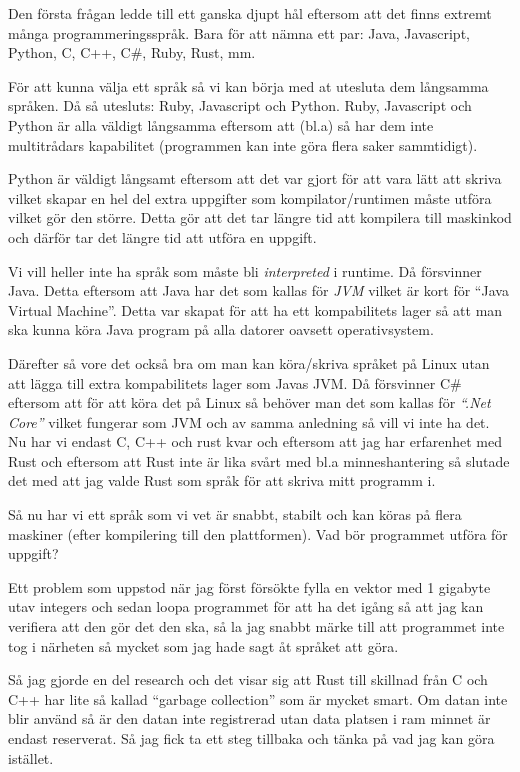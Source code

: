 \documentclass[12pt, a4paper]{report}
\begin{document}
Den första frågan ledde till ett ganska djupt hål eftersom att det finns extremt många programmeringsspråk. Bara för att nämna ett par: Java, Javascript, Python, C, C++, C\#, Ruby, Rust, mm. 


För att kunna välja ett språk så vi kan börja med at utesluta dem långsamma språken. Då så utesluts: Ruby, Javascript och Python. Ruby, Javascript och Python är alla väldigt långsamma eftersom att (bl.a) så har dem inte multitrådars kapabilitet (programmen kan inte göra flera saker sammtidigt).

 Python är väldigt långsamt eftersom att det var gjort för att vara lätt att skriva vilket skapar en hel del extra uppgifter som kompilator/runtimen måste utföra vilket gör den större. Detta gör att det tar längre tid att kompilera till maskinkod och därför tar det längre tid att utföra en uppgift. 
 
 Vi vill heller inte ha språk som måste bli \textit{interpreted} i runtime. Då försvinner Java. Detta eftersom att Java har det som kallas för \textit{JVM} vilket är kort för ``Java Virtual Machine''. Detta var skapat för att ha ett kompabilitets lager så att man ska kunna köra Java program på alla datorer oavsett operativsystem. 
 
 Därefter så vore det också bra om man kan köra/skriva språket på Linux utan att lägga till extra kompabilitets lager som Javas JVM. Då försvinner C\# eftersom att för att köra det på Linux så behöver man det som kallas för \textit{``.Net Core''} vilket fungerar som JVM och av samma anledning så vill vi inte ha det. Nu har vi endast C, C++ och rust kvar och eftersom att jag har erfarenhet med Rust och eftersom att Rust inte är lika svårt med bl.a minneshantering så slutade det med att jag valde Rust som språk för att skriva mitt programm i.
 
 
Så nu har vi ett språk som vi vet är snabbt, stabilt och kan köras på flera maskiner (efter kompilering till den plattformen). Vad bör programmet utföra för uppgift?

Ett problem som uppstod när jag först försökte fylla en vektor med 1 gigabyte utav integers och sedan loopa programmet för att ha det igång så att jag kan verifiera att den gör det den ska, så la jag snabbt märke till att programmet inte tog i närheten så mycket som jag hade sagt åt språket att göra.

Så jag gjorde en del research och det visar sig att Rust till skillnad från C och C++ har lite så kallad ``garbage collection'' som är mycket smart. Om datan inte blir använd så är den datan inte registrerad utan data platsen i ram minnet är endast reserverat. Så jag fick ta ett steg tillbaka och tänka på vad jag kan göra istället.
 
\end{document}
